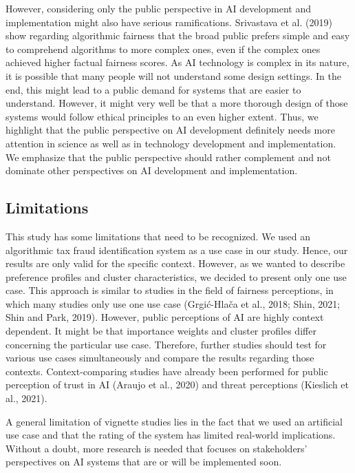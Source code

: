 \documentclass{article}
\begin{document}
However, considering only the public perspective in AI development and
implementation might also have serious ramifications. Srivastava et al.
(2019) show regarding algorithmic fairness that the broad public prefers
simple and easy to comprehend algorithms to more complex ones, even if
the complex ones achieved higher factual fairness scores. As AI
technology is complex in its nature, it is possible that many people
will not understand some design settings. In the end, this might lead to
a public demand for systems that are easier to understand. However, it
might very well be that a more thorough design of those systems would
follow ethical principles to an even higher extent. Thus, we highlight
that the public perspective on AI development definitely needs more
attention in science as well as in technology development and
implementation. We emphasize that the public perspective should rather
complement and not dominate other perspectives on AI development and
implementation.

\hypertarget{limitations}{%
\subsection{Limitations}\label{limitations}}

This study has some limitations that need to be recognized. We used an
algorithmic tax fraud identification system as a use case in our study.
Hence, our results are only valid for the specific context. However, as
we wanted to describe preference profiles and cluster characteristics,
we decided to present only one use case. This approach is similar to
studies in the field of fairness perceptions, in which many studies only
use one use case (Grgić-Hlača et al., 2018; Shin, 2021; Shin and Park,
2019). However, public perceptions of AI are highly context dependent.
It might be that importance weights and cluster profiles differ
concerning the particular use case. Therefore, further studies should
test for various use cases simultaneously and compare the results
regarding those contexts. Context-comparing studies have already been
performed for public perception of trust in AI (Araujo et al., 2020) and
threat perceptions (Kieslich et al., 2021).

A general limitation of vignette studies lies in the fact that we used
an artificial use case and that the rating of the system has limited
real-world implications. Without a doubt, more research is needed that
focuses on stakeholders' perspectives on AI systems that are or will be
implemented soon.
\end{document}
